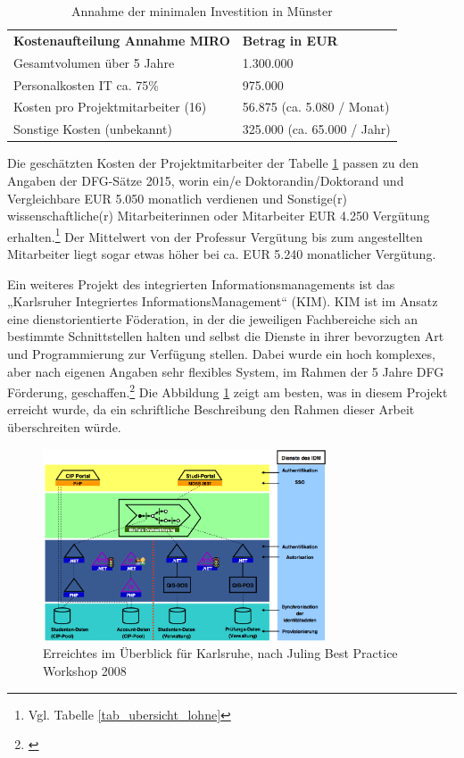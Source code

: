 \begin{table}[h!]
	\begin{tabularx}{\textwidth}{l|l}
		\hline
		\textbf{Kostenaufteilung Annahme MIRO} & \textbf{Betrag in EUR}\\
		Gesamtvolumen über 5 Jahre & 1.300.000\\
		Personalkosten IT ca. 75\% & 975.000\\
		Kosten pro Projektmitarbeiter (16) & 56.875 (ca. 5.080 / Monat)\\ 
		Sonstige Kosten (unbekannt) & 325.000 (ca. 65.000 / Jahr)\\
		\hline
    \end{tabularx}
    \caption{Annahme der minimalen Investition in Münster}
    \label{tab_minimale_investition_munster}
\end{table}

Die geschätzten Kosten der Projektmitarbeiter der Tabelle \ref{tab_minimale_investition_munster} passen zu den Angaben der DFG-Sätze 2015, worin ein/e Doktorandin/Doktorand und Vergleichbare EUR 5.050 monatlich verdienen und Sonstige(r) wissenschaftliche(r) Mitarbeiterinnen oder Mitarbeiter EUR 4.250 Vergütung erhalten.\footnote{Vgl. Tabelle \ref{tab_ubersicht_lohne}} Der Mittelwert von der Professur Vergütung bis zum angestellten Mitarbeiter liegt sogar etwas höher bei ca. EUR 5.240 monatlicher Vergütung.

Ein weiteres Projekt des integrierten Informationsmanagements ist das „Karlsruher Integriertes InformationsManagement“ (KIM).
KIM ist im Ansatz eine dienstorientierte Föderation, in der die jeweiligen Fachbereiche sich an bestimmte Schnittstellen 
halten und selbst die Dienste in ihrer bevorzugten Art und Programmierung zur Verfügung stellen. Dabei wurde ein hoch komplexes, 
aber nach eigenen Angaben sehr flexibles System, im Rahmen der 5 Jahre DFG Förderung, geschaffen.\footnote{\cite{bode_informationsmanagement_2010}}
Die Abbildung \ref{fig_ubersicht_karlsruhe} zeigt am besten, was in diesem Projekt erreicht wurde, da ein schriftliche Beschreibung den Rahmen dieser Arbeit überschreiten würde.


\begin{figure}[h!]
	\centering
	\includegraphics[width=0.75\textwidth]
	{kapitel/gruppe4_2/bilder/ubersicht_karlsruhe}
	\caption{Erreichtes im Überblick für Karlsruhe, nach Juling Best Practice Workshop 2008}
	\label{fig_ubersicht_karlsruhe}
\end{figure}

